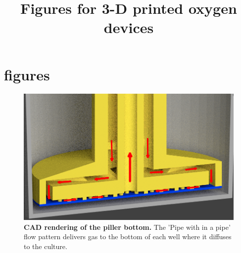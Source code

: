 \documentclass[]{article}
\title{Figures for  3-D printed oxygen devices}
\author{}
\begin{document}

\section{figures}

\begin{figure}[H]
\includegraphics[scale=0.2]{../presentation-figures/piller-well-render-with-arrows.png} %
\caption{
{\bf CAD rendering of the piller bottom.} The 'Pipe with in a pipe' flow pattern delivers gas to the bottom of each well where it diffuses to the culture.  
}
\label{piller-well-render-figure}
\end{figure}
\end{document}

